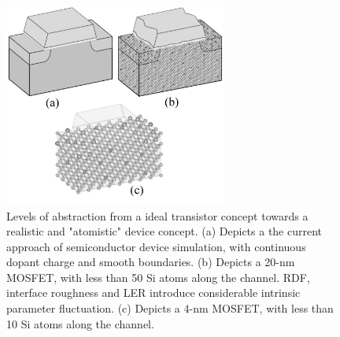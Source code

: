 \documentclass[pgmicro,mestrado,english]{iiufrgs}
\begin{document}

    \begin{figure} []
        \centering
        \includegraphics[width=0.65\textwidth, trim={0 0 0 0},clip]{transistorVariability.png}
        \caption{Levels of abstraction from a ideal transistor concept towards a realistic and "atomistic" device concept. (a) Depicts a the current approach of semiconductor device simulation, with continuous dopant charge and smooth boundaries. (b) Depicts a 20-nm MOSFET, with less than 50 Si atoms along the channel. RDF, interface roughness and LER introduce considerable intrinsic parameter fluctuation. (c) Depicts a 4-nm MOSFET, with less than 10 Si atoms along the channel. }
        \label{fig:transAbs}
    \end{figure}
\end{document}
